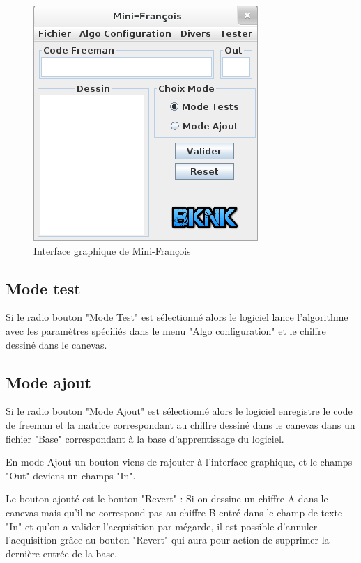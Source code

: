 \documentclass[10pt,a4paper]{report}
\begin{document}
\begin{figure}[!h]
	\center
		\includegraphics[scale=0.5]{./Ressource/IG.png}
 	\caption{Interface graphique de Mini-François}
\end{figure}

\subsection*{Mode test}
\begin{flushleft}
Si le radio bouton "Mode Test" est sélectionné alors le logiciel lance l'algorithme avec les paramètres spécifiés dans le menu "Algo configuration" et le chiffre dessiné dans le canevas.
\end{flushleft}


\subsection*{Mode ajout}
\begin{flushleft}
Si le radio bouton "Mode Ajout" est sélectionné alors le logiciel enregistre le code de freeman et la matrice correspondant au chiffre dessiné dans le canevas dans un fichier "Base" correspondant à la base d'apprentissage du logiciel.

En mode Ajout un bouton viens de rajouter à l'interface graphique, et le champs "Out" deviens un champs "In".

\item Le bouton ajouté est le bouton "Revert" : Si on dessine un chiffre A dans le canevas mais qu'il ne correspond pas au chiffre B entré dans le champ de texte "In" et qu'on a valider l'acquisition par mégarde, il est possible d'annuler l'acquisition grâce au bouton "Revert" qui aura pour action de supprimer la dernière entrée de la base.

\end{flushleft}
\end{document}
